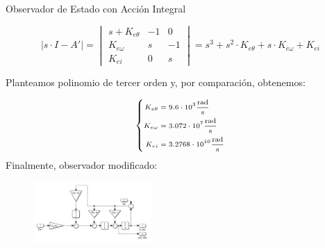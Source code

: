 \documentclass[12pt]{beamer}
\begin{document}
\begin{frame}{Observador de Estado con Acción Integral}\small

\begin{equation}
|s \cdot I - A'| = \begin{vmatrix}
    s + K_{e\theta} & -1 & 0 \\
    K_{e\omega} & s & -1 \\
    K_{ei} & 0 & s
\end{vmatrix}
= s^3 + s^2 \cdot K_{e\theta} + s \cdot K_{e\omega} + K_{ei}
\end{equation}

Planteamos polinomio de tercer orden y, por comparación, obtenemos:

\begin{equation}\scriptsize
\left\{
\begin{aligned}
K_{e\theta} &= 9.6 \cdot 10^3 \frac{\text{rad}}{\text{s}} \\ 
K_{e\omega} &= 3.072 \cdot 10^7 \frac{\text{rad}}{\text{s}} \\
K_{ei} &= 3.2768 \cdot 10^{10} \frac{\text{rad}}{\text{s}}
\end{aligned}
\right.
\end{equation}
    Finalmente, observador modificado:
    \begin{figure}[h]
    \centering
    \includegraphics[width=0.4\textwidth]{Imagenes/Observador_PID.png}
    \label{fig:AcercamientoErrorPosicionPerturbacionPID}
\end{figure}
\end{frame}
\end{document}
